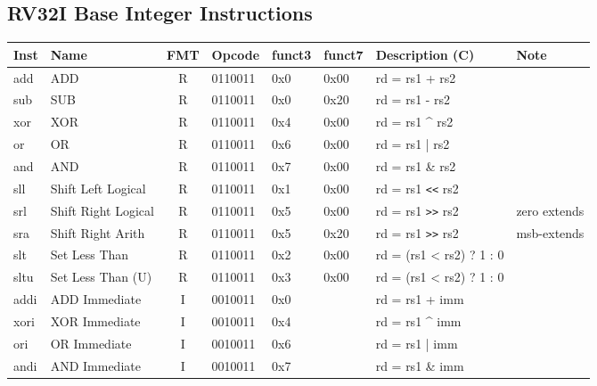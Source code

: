 \subsection*{RV32I Base Integer Instructions}

\begin{tabular}
{T | l | c | T | T | T | T | l} \hline
\rm Inst & Name                    & FMT & \rm Opcode & \rm funct3 & \rm funct7 & \rm Description (C)          & Note \\ \hline
add      & ADD                     & R   & 0110011    & 0x0    & 0x00   & rd = rs1 + rs2               & \\
sub      & SUB                     & R   & 0110011    & 0x0    & 0x20   & rd = rs1 - rs2               & \\
xor      & XOR                     & R   & 0110011    & 0x4    & 0x00   & rd = rs1 \^{} rs2            & \\
or       & OR                      & R   & 0110011    & 0x6    & 0x00   & rd = rs1 | rs2               & \\
and      & AND                     & R   & 0110011    & 0x7    & 0x00   & rd = rs1 \& rs2              & \\
sll      & Shift Left Logical      & R   & 0110011    & 0x1    & 0x00   & rd = rs1 \verb|<<| rs2       & \\
srl      & Shift Right Logical     & R   & 0110011    & 0x5    & 0x00   & rd = rs1 \verb|>>| rs2       & zero extends \\
sra      & Shift Right Arith       & R   & 0110011    & 0x5    & 0x20   & rd = rs1 \verb|>>| rs2       & msb-extends \\
slt      & Set Less Than           & R   & 0110011    & 0x2    & 0x00   & rd = (rs1 < rs2) ? 1 : 0     & \\
sltu     & Set Less Than (U)       & R   & 0110011    & 0x3    & 0x00   & rd = (rs1 < rs2) ? 1 : 0     & \\ \hline
addi     & ADD Immediate           & I   & 0010011    & 0x0    &        & rd = rs1 + imm               & \\
xori     & XOR Immediate           & I   & 0010011    & 0x4    &        & rd = rs1 \^{} imm            & \\
ori      & OR Immediate            & I   & 0010011    & 0x6    &        & rd = rs1 | imm               & \\
andi     & AND Immediate           & I   & 0010011    & 0x7    &        & rd = rs1 \& imm              & \\

\end{tabular}
